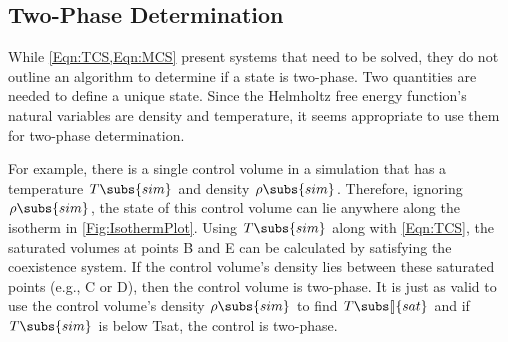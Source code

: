 \documentclass[12pt]{WisconsinThesis}
\newcommand{\Tsat}{\ensuremath{T\subs[\!\!\:]{sat}}\xspace}
\newcommand{\HFE}{Helmholtz free energy\xspace}
\begin{document}
\subsection{Two-Phase Determination}
While \cref{Eqn:TCS,Eqn:MCS} present systems that need to be solved, they do not outline an algorithm to determine if a state is two-phase.
Two quantities are needed to define a unique state.  
Since the \HFE function's natural variables are density and temperature, it seems appropriate to use them for two-phase determination.

\begin{figure}[h!]%
\end{figure}

For example, there is a single control volume in a simulation that has a temperature $T\subs{sim}$ and density $\rho\subs{sim}$.
Therefore, ignoring $\rho\subs{sim}$, the state of this control volume can lie anywhere along the isotherm in \cref{Fig:IsothermPlot}.
Using $T\subs{sim}$ along with \cref{Eqn:TCS}, the saturated volumes at points B and E can be calculated by satisfying the coexistence system.
If the control volume's density lies between these saturated points (e.g., C or D), then the control volume is two-phase.
It is just as valid to use the control volume's density $\rho\subs{sim}$ to find \Tsat and if $T\subs{sim}$ is below Tsat, the control is two-phase.
\end{document}
